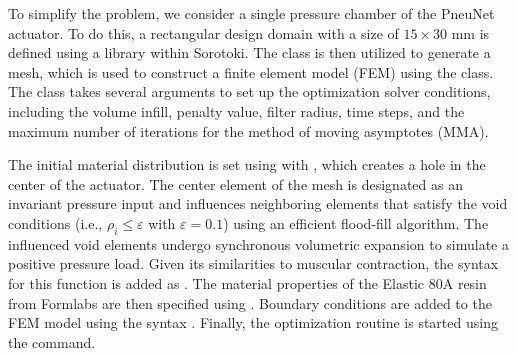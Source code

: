 To simplify the problem, we consider a single pressure chamber of the PneuNet actuator. To do this, a rectangular design domain with a size of $15 \times 30$ \si{\milli \meter} is defined using a  library within Sorotoki. The  class is then utilized to generate a mesh, which is used to construct a finite element model (FEM) using the  class. The  class takes several arguments to set up the optimization solver conditions, including the volume infill, penalty value, filter radius, time steps, and the maximum number of iterations for the method of moving asymptotes (MMA).

%
%
The initial material distribution is set using  with , which creates a hole in the center of the actuator. The center element of the mesh is designated as an invariant pressure input and influences neighboring elements that satisfy the void conditions (i.e., $\rho_i \le \varepsilon$ with $\varepsilon = 0.1$) using an efficient flood-fill algorithm. The influenced void elements undergo synchronous volumetric expansion to simulate a positive pressure load. Given its similarities to muscular contraction, the syntax for this function is added as . The material properties of the Elastic 80A resin from Formlabs are then specified using . Boundary conditions are added to the FEM model using the syntax . Finally, the optimization routine is started using the  command. %





